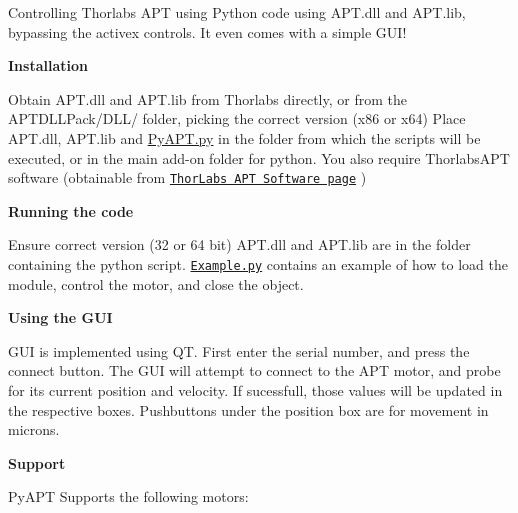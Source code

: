 Controlling Thorlabs A\+PT using Python code using A\+P\+T.\+dll and A\+P\+T.\+lib, bypassing the activex controls. It even comes with a simple G\+U\+I!

{\bfseries Installation}

Obtain A\+P\+T.\+dll and A\+P\+T.\+lib from Thorlabs directly, or from the {\ttfamily A\+P\+T\+D\+L\+L\+Pack/\+D\+L\+L/} folder, picking the correct version ({\ttfamily x86} or {\ttfamily x64}) Place A\+P\+T.\+dll, A\+P\+T.\+lib and \hyperlink{_py_a_p_t_8py_source}{Py\+A\+P\+T.\+py} in the folder from which the scripts will be executed, or in the main add-\/on folder for python. You also require Thorlabs\+A\+PT software (obtainable from \href{http://www.thorlabs.us/software_pages/ViewSoftwarePage.cfm?Code=APT}{\tt Thor\+Labs A\+PT Software page} )

{\bfseries Running the code}

Ensure correct version (32 or 64 bit) A\+P\+T.\+dll and A\+P\+T.\+lib are in the folder containing the python script. \href{Example.py}{\tt {\ttfamily Example.\+py}} contains an example of how to load the module, control the motor, and close the object.

{\bfseries Using the G\+UI}



G\+UI is implemented using QT. First enter the serial number, and press the connect button. The G\+UI will attempt to connect to the A\+PT motor, and probe for it\textquotesingle{}s current position and velocity. If sucessfull, those values will be updated in the respective boxes. Pushbuttons under the position box are for movement in microns.

{\bfseries Support}

Py\+A\+PT Supports the following motors\+:

